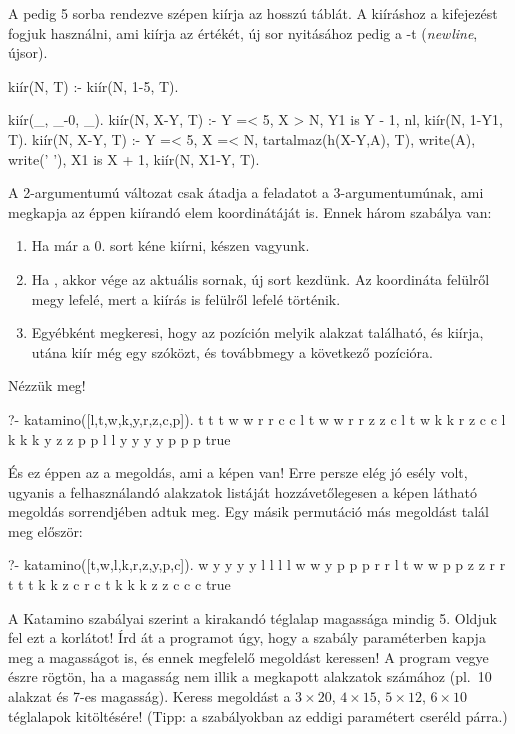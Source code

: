 A  pedig 5 sorba rendezve szépen
kiírja az  hosszú  táblát. A kiíráshoz a
 kifejezést fogjuk használni, ami
kiírja az  értékét, új sor nyitásához pedig a
-t (\emph{newline}, újsor).
\begin{program}
kiír(N, T) :- kiír(N, 1-5, T).

kiír(_, _-0, _).
kiír(N, X-Y, T) :-
    Y =< 5, X > N, Y1 is Y - 1,
    nl, kiír(N, 1-Y1, T).
kiír(N, X-Y, T) :-
    Y =< 5, X =< N,
    tartalmaz(h(X-Y,A), T),
    write(A), write(' '),
    X1 is X + 1,
    kiír(N, X1-Y, T).
\end{program}
A 2-argumentumú változat csak átadja a feladatot a
3-ar\-gu\-men\-tu\-mú\-nak, ami megkapja az éppen kiírandó
elem  koordinátáját is. Ennek három szabálya
van:
\begin{enumerate}
\item Ha már a 0. sort kéne kiírni, készen vagyunk.
\item Ha , akkor vége az aktuális sornak,
  új sort kezdünk. Az  koordináta felülről
  megy lefelé, mert a kiírás is felülről lefelé
  történik.
\item Egyébként megkeresi, hogy az  pozíción
  melyik alakzat található, és kiírja, utána kiír
  még egy szóközt, és továbbmegy a következő 
  pozícióra.
\end{enumerate}
Nézzük meg!
\begin{query}
?- katamino([l,t,w,k,y,r,z,c,p]).
t t t w w r r c c 
l t w w r r z z c 
l t w k k r z c c 
l k k k y z z p p 
l l y y y y p p p 
true
\end{query}
És ez éppen az a megoldás, ami a képen van! Erre
persze elég jó esély volt, ugyanis a felhasználandó
alakzatok listáját hozzávetőlegesen a képen látható
megoldás sorrendjében adtuk meg. Egy másik
permutáció más megoldást talál meg először:
\begin{query}
?- katamino([t,w,l,k,r,z,y,p,c]).
w y y y y l l l l 
w w y p p p r r l 
t w w p p z z r r 
t t t k k z c r c 
t k k k z z c c c 
true 
\end{query}

\begin{problem}
A Katamino szabályai szerint a kirakandó téglalap
magassága mindig 5. Oldjuk fel ezt a korlátot!
Írd át a programot úgy, hogy a 
szabály paraméterben kapja meg a magasságot is, és
ennek megfelelő megoldást keressen! A program vegye
észre rögtön, ha a magasság nem illik a megkapott
alakzatok számához (pl.~10 alakzat és 7-es
magasság). Keress megoldást a $3\times20$,
$4\times15$, $5\times12$, $6\times10$ téglalapok
kitöltésére! (Tipp: a szabályokban az eddigi 
paramétert cseréld  párra.)
\end{problem}

